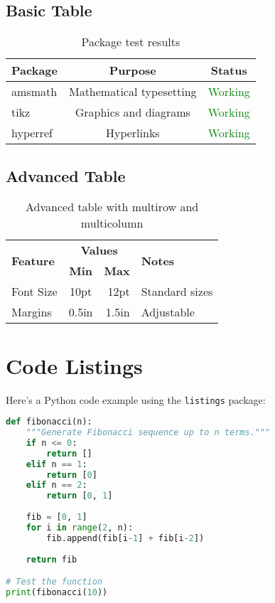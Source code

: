 \documentclass[12pt,a4paper]{article}
\begin{document}
\subsection{Basic Table}

\begin{table}[H]
\centering
\begin{tabular}{lcc}
\toprule
\textbf{Package} & \textbf{Purpose} & \textbf{Status} \\
\midrule
amsmath & Mathematical typesetting & \textcolor{green}{Working} \\
tikz & Graphics and diagrams & \textcolor{green}{Working} \\
hyperref & Hyperlinks & \textcolor{green}{Working} \\
\bottomrule
\end{tabular}
\caption{Package test results}
\label{tab:packages}
\end{table}

\subsection{Advanced Table}

\begin{table}[H]
\centering
\begin{tabular}{|l|c|r|p{3cm}|}
\hline
\multirow{2}{*}{\textbf{Feature}} & \multicolumn{2}{c|}{\textbf{Values}} & \multirow{2}{*}{\textbf{Notes}} \\
\cline{2-3}
& \textbf{Min} & \textbf{Max} & \\
\hline
Font Size & 10pt & 12pt & Standard sizes \\
Margins & 0.5in & 1.5in & Adjustable \\
\hline
\end{tabular}
\caption{Advanced table with multirow and multicolumn}
\end{table}

\section{Code Listings}

Here's a Python code example using the \texttt{listings} package:

\begin{lstlisting}[language=Python, caption=Python Example]
def fibonacci(n):
    """Generate Fibonacci sequence up to n terms."""
    if n <= 0:
        return []
    elif n == 1:
        return [0]
    elif n == 2:
        return [0, 1]
    
    fib = [0, 1]
    for i in range(2, n):
        fib.append(fib[i-1] + fib[i-2])
    
    return fib

# Test the function
print(fibonacci(10))
\end{lstlisting}
\end{document}
